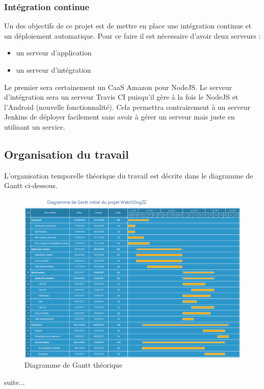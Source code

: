 \subsubsection{Intégration continue}
Un des objectifs de ce projet est de mettre en place une intégration continue et un déploiement automatique. Pour ce faire il est nécessaire d'avoir deux serveurs :
\begin{itemize}
    \item un serveur d'application
    \item un serveur d'intégration
\end{itemize}

Le premier sera certainement un CaaS Amazon pour NodeJS. Le serveur d'intégration sera un serveur Travis CI puisqu'il gère à la fois le NodeJS et l'Android (nouvelle fonctionnalité). Cela permettra contrairement à un serveur Jenkins de déployer facilement sans avoir à gérer un serveur mais juste en utilisant un service.

\subsection{Organisation du travail}

L'organisation temporelle théorique du travail est décrite dans le diagramme de Gantt ci-dessous.

\begin{landscape}
    \begin{figure}[h]
        \centering
        \includegraphics[height=\textwidth]{../gantt_initial.png}
        \caption{Diagramme de Gantt théorique}
    \end{figure}
\end{landscape}

suite...
